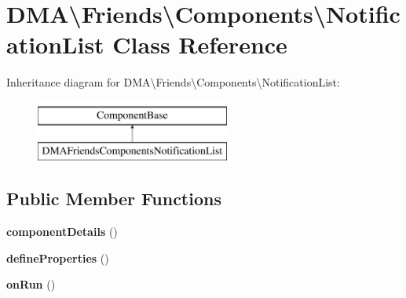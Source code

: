 \hypertarget{classDMA_1_1Friends_1_1Components_1_1NotificationList}{\section{D\+M\+A\textbackslash{}Friends\textbackslash{}Components\textbackslash{}Notification\+List Class Reference}
\label{classDMA_1_1Friends_1_1Components_1_1NotificationList}
}
Inheritance diagram for D\+M\+A\textbackslash{}Friends\textbackslash{}Components\textbackslash{}Notification\+List\+:\begin{figure}[H]
\begin{center}
\leavevmode
\includegraphics[height=2.000000cm]{dc/d03/classDMA_1_1Friends_1_1Components_1_1NotificationList}
\end{center}
\end{figure}
\subsection*{Public Member Functions}
\begin{DoxyCompactItemize}
\item 
\hypertarget{classDMA_1_1Friends_1_1Components_1_1NotificationList_a5f6b1107482bf7d15e379cad1c58e537}{{\bfseries component\+Details} ()}\label{classDMA_1_1Friends_1_1Components_1_1NotificationList_a5f6b1107482bf7d15e379cad1c58e537}

\item 
\hypertarget{classDMA_1_1Friends_1_1Components_1_1NotificationList_a0e98d6eba8a7d10629c7a0e051937d98}{{\bfseries define\+Properties} ()}\label{classDMA_1_1Friends_1_1Components_1_1NotificationList_a0e98d6eba8a7d10629c7a0e051937d98}

\item 
\hypertarget{classDMA_1_1Friends_1_1Components_1_1NotificationList_a5756b2cf174bc7919896c256ad9f44aa}{{\bfseries on\+Run} ()}\label{classDMA_1_1Friends_1_1Components_1_1NotificationList_a5756b2cf174bc7919896c256ad9f44aa}

\end{DoxyCompactItemize}
